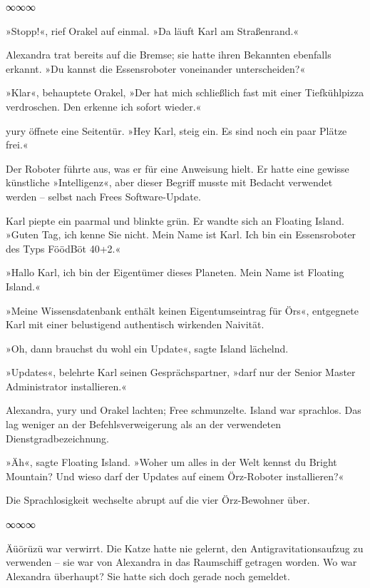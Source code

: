 \begin{center}
∞∞∞
\end{center}

»Stopp!«, rief Orakel auf einmal. »Da läuft Karl am Straßenrand.«

Alexandra trat bereits auf die Bremse; sie hatte ihren Bekannten ebenfalls erkannt. »Du kannst die Essensroboter voneinander unterscheiden?«

»Klar«, behauptete Orakel, »Der hat mich schließlich fast mit einer Tiefkühlpizza verdroschen. Den erkenne ich sofort wieder.«

yury öffnete eine Seitentür. »Hey Karl, steig ein. Es sind noch ein paar Plätze frei.«

Der Roboter führte aus, was er für eine Anweisung hielt. Er hatte eine gewisse künstliche »Intelligenz«, aber dieser Begriff musste mit Bedacht verwendet werden – selbst nach Frees Software-Update.

Karl piepte ein paarmal und blinkte grün. Er wandte sich an Floating Island. »Guten Tag, ich kenne Sie nicht. Mein Name ist Karl. Ich bin ein Essensroboter des Typs FöödBöt 40+2.«

»Hallo Karl, ich bin der Eigentümer dieses Planeten. Mein Name ist Floating Island.«

»Meine Wissensdatenbank enthält keinen Eigentumseintrag für Örs«, entgegnete Karl mit einer belustigend authentisch wirkenden Naivität.

»Oh, dann brauchst du wohl ein Update«, sagte Island lächelnd.

»Updates«, belehrte Karl seinen Gesprächspartner, »darf nur der Senior Master Administrator installieren.«

Alexandra, yury und Orakel lachten; Free schmunzelte. Island war sprachlos. Das lag weniger an der Befehlsverweigerung als an der verwendeten Dienstgradbezeichnung.

»Äh«, sagte Floating Island. »Woher um alles in der Welt kennst du Bright Mountain? Und wieso darf der Updates auf einem Örz-Roboter installieren?«

Die Sprachlosigkeit wechselte abrupt auf die vier Örz-Bewohner über.

\begin{center}
∞∞∞
\end{center}

Äüörüzü war verwirrt. Die Katze hatte nie gelernt, den Antigravitationsaufzug zu verwenden – sie war von Alexandra in das Raumschiff getragen worden. Wo war Alexandra überhaupt? Sie hatte sich doch gerade noch gemeldet.

